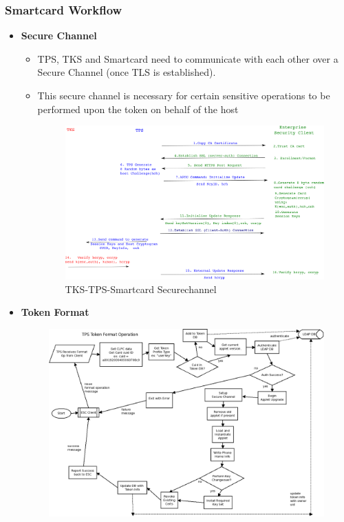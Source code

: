 \documentclass[12pt]{report}
\begin{document}
\subsubsection{Smartcard Workflow}
    \begin{itemize}
        \item \textbf{Secure Channel}~\cite{RedHat:securechannel}
            \begin{itemize}
                \item TPS, TKS and Smartcard need to communicate with each other over a Secure Channel (once TLS is established).
                \item This secure channel is necessary for certain sensitive operations to be performed upon the token on behalf of the host
                    \begin{figure}[H]
                        \centering
                        \includegraphics[width=120mm]{Images/tps-tks-smartcard-securechannel.png}
                        \caption{TKS-TPS-Smartcard Securechannel}
                    \end{figure}
            \end{itemize}
        \item \textbf{Token Format}
            \begin{figure}[H]
                \centering
                \includegraphics[width=120mm]{Images/TPS_Format.png}

\end{figure}
\end{itemize}
\end{document}
